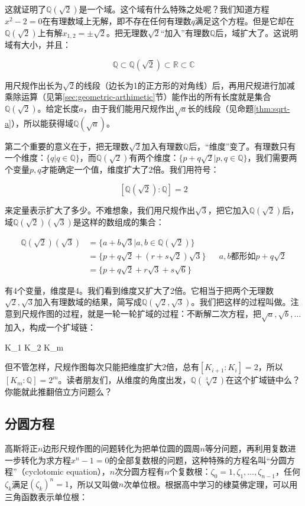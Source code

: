 这就证明了$\mathbb{Q}(\sqrt{2})$是一个域。这个域有什么特殊之处呢？我们知道方程$x^2 - 2 = 0$在有理数域上无解，即不存在任何有理数$q$满足这个方程。但是它却在$\mathbb{Q}(\sqrt{2})$上有解$x_{1, 2} = \pm \sqrt{2}$。把无理数$\sqrt{2}$“加入”有理数$\mathbb{Q}$后，域扩大了。这说明域有大小，并且：

\[
\mathbb{Q} \subset \mathbb{Q}(\sqrt{2}) \subset \mathbb{R} \subset \mathbb{C}
\]

用尺规作出长为$\sqrt{2}$的线段（边长为1的正方形的对角线）后，再用尺规进行加减乘除运算（见第\ref{sec:geometric-arthimetic}节）能作出的所有长度就是集合$\mathbb{Q}(\sqrt{2})$。给定长度$a$，由于我们能用尺规作出$\sqrt{a}$长的线段（见命题\ref{thm:sqrt-a}），所以能获得域$\mathbb{Q}(\sqrt{a})$。

第二个重要的意义在于，把无理数$\sqrt{2}$加入有理数$\mathbb{Q}$后，“维度”变了。有理数只有一个维度：$\{q | q \in \mathbb{Q}\}$，而$\mathbb{Q}(\sqrt{2})$有两个维度：$\{p + q \sqrt{2} | p, q \in \mathbb{Q}\}$，我们需要两个变量$p, q$才能确定一个值，维度扩大了2倍。我们用符号：

\[
[\mathbb{Q}(\sqrt{2}) : \mathbb{Q}] = 2
\]

来定量表示扩大了多少。不难想象，我们用尺规作出$\sqrt{3}$，把它加入$\mathbb{Q}(\sqrt{2})$后，域$\mathbb{Q}(\sqrt{2})(\sqrt{3})$是这样的数组成的集合：

\begin{align*}
  \mathbb{Q}(\sqrt{2})(\sqrt{3}) &= \{a + b \sqrt{3} | a, b \in \mathbb{Q}(\sqrt{2}) \} \\
  &= \{p + q \sqrt{2} + (r + s\sqrt{2})\sqrt{3} \} && a, b \text{都形如} p + q\sqrt{2} \\
  &= \{p + q \sqrt{2} + r\sqrt{3} + s\sqrt{6} \}
\end{align*}

有4个变量，维度是4。我们看到维度又扩大了2倍。它相当于把两个无理数$\sqrt{2}, \sqrt{3}$加入有理数域的结果，简写成$\mathbb{Q}(\sqrt{2}, \sqrt{3})$。我们把这样的过程叫做。注意到尺规作图的过程，就是一轮一轮扩域的过程：不断解二次方程，把$\sqrt{a}, \sqrt{b}, \dotsc$加入，构成一个扩域链：

\be
{} \subset K_1 \subset K_2 \subset \dotsb \subset K_m
\label{eq:tower-of-geometric-field-ext}
\ee

但不管怎样，尺规作图每次只能把维度扩大2倍，总有$[K_{i+1} : K_i] = 2$，所以$[K_m : \mathbb{Q}] = 2^m$。读者朋友们，从维度的角度出发，$\mathbb{Q}(\sqrt[3]{2})$在这个扩域链中么？你能就此推翻倍立方问题么？

\subsection{分圆方程}
高斯将正$n$边形尺规作图的问题转化为把单位圆的圆周$n$等分问题，再利用复数进一步转化为求方程$x^n - 1 = 0$的全部复数根的问题，这种特殊的方程名叫“分圆方程”（cyclotomic equation），$n$次分圆方程有$n$个复数根：$\zeta_0 = 1, \zeta_1, \dotsc, \zeta_{n-1}$，任何$\zeta_k$满足$(\zeta_k)^n = 1$，所以又叫做$n$次单位根。根据高中学习的棣莫佛定理，可以用三角函数表示单位根：

